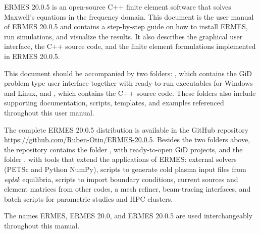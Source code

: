 %
%

ERMES 20.0.5 is an open-source C++ finite element software that solves Maxwell's equations in the frequency domain. This document is the user manual of ERMES 20.0.5 and contains a step-by-step guide on how to install ERMES, run simulations, and visualize the results. It also describes the graphical user interface, the C++ source code, and the finite element formulations implemented in ERMES 20.0.5.

This document should be accompanied by two folders: , which contains the GiD problem type user interface together with ready-to-run executables for Windows and Linux, and , which contains the C++ source code. These folders also include supporting documentation, scripts, templates, and examples referenced throughout this user manual.

The complete ERMES 20.0.5 distribution is available in the GitHub repository \url{https://github.com/Ruben-Otin/ERMES-20.0.5}. Besides the two folders above, the repository contains the folder , with ready-to-open GiD projects, and the folder , with tools that extend the applications of ERMES: external solvers (PETSc and Python NumPy), scripts to generate cold plasma input files from \textit{eqdsk} equilibria, scripts to import boundary conditions, current sources and element matrices from other codes, a mesh refiner, beam-tracing interfaces, and batch scripts for parametric studies and HPC clusters.

The names ERMES, ERMES 20.0, and ERMES 20.0.5 are used interchangeably throughout this manual.





